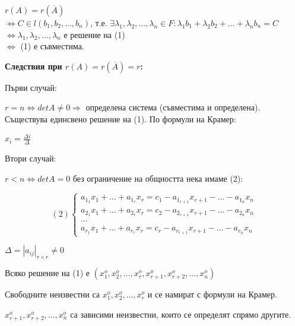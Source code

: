 \documentclass[fleqn,12pt]{article}
\begin{document}
\begin{flushleft}
    \vspace{5mm}

    $ r(A) = r(\overline{A})$ \\
    $\Leftrightarrow C \in l(b_1, b_2, \dots, b_n)$, т.е. $\exists \lambda_1, \lambda_2, \dots, \lambda_n \in F: \lambda_1 b_1 + \lambda_2 b_2 + \dots + \lambda_n b_n = C$ \\
    $\Leftrightarrow \lambda_1, \lambda_2, \dots, \lambda_n$ е решение на (1) \\
    $\Leftrightarrow$ (1) е съвместима. \square

    \vspace{5mm}
    \textbf{Следствия при $r(A) = r(\overline{A}) = r$:}


    Първи случай: 

    $ r = n \Leftrightarrow detA \neq 0 \Rightarrow $ определена система (съвместима и определена). Съществува единсвено решение на (1). По формули на Крамер:

    $ x_i = \frac{\Delta i}{\Delta} $

    \vspace{5mm}

    Втори случай:

    $ r < n \Leftrightarrow detA = 0 $ без ограничение на общността нека имаме (2):

    \begin{equation*}
        (2)\begin{cases}
            a_{1_1}x_1+\dots+a_{1_r}x_r = c_1 - a_{1_{r+1}}x_{r+1} - \dots - a_{1_n}x_n\\
            a_{2_1}x_1+\dots+a_{2_r}x_r = c_2 - a_{2_{r+1}}x_{r+1} - \dots - a_{2_n}x_n\\
            \dots\\
            a_{r_1}x_1+\dots+a_{r_r}x_r = c_r - a_{r_{r+1}}x_{r+1} - \dots - a_{r_n}x_n
        \end{cases}
    \end{equation*}

    $ \Delta = | a_{ij} |_{r \times r} \neq 0 $

    Всяко решение на (1) е $ ( x_1^o, x_2^o, \dots, x_r^o, x_{r+1}^o, x_{r+2}^o, \dots, x_n^o ) $

    Свободните неизвестни са $ x_1^o, x_2^o, \dots, x_r^o $ и се намират с формули на Крамер.

    $x_{r+1}^o, x_{r+2}^o, \dots, x_n^o $ са зависими неизвестни, които се определят спрямо другите.



\end{flushleft}
\end{document}
